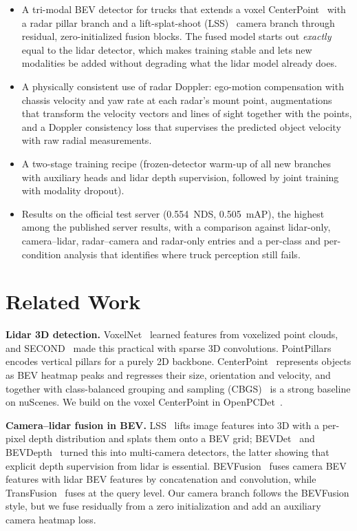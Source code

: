 \documentclass[conference]{IEEEtran}
\begin{document}
\begin{itemize}
\item A tri-modal BEV detector for trucks that extends a voxel CenterPoint~\cite{yin2021centerpoint} with a radar
pillar branch and a lift-splat-shoot (LSS)~\cite{philion2020lss} camera branch through residual, zero-initialized
fusion blocks. The fused model starts out \emph{exactly} equal to the lidar detector, which makes training stable and
lets new modalities be added without degrading what the lidar model already does.
\item A physically consistent use of radar Doppler: ego-motion compensation with chassis velocity and yaw rate at
each radar's mount point, augmentations that transform the velocity vectors and lines of sight together with the
points, and a Doppler consistency loss that supervises the predicted object velocity with raw radial measurements.
\item A two-stage training recipe (frozen-detector warm-up of all new branches with auxiliary heads and lidar depth
supervision, followed by joint training with modality dropout).
\item Results on the official test server (0.554~NDS, 0.505~mAP), the highest among the published server results, with
a comparison against lidar-only, camera--lidar, radar--camera and radar-only entries and a per-class and per-condition
analysis that identifies where truck perception still fails.
\end{itemize}

\section{Related Work}

\textbf{Lidar 3D detection.} VoxelNet~\cite{zhou2018voxelnet} learned features from voxelized point clouds, and
SECOND~\cite{yan2018second} made this practical with sparse 3D convolutions. PointPillars~\cite{lang2019pointpillars}
encodes vertical pillars for a purely 2D backbone. CenterPoint~\cite{yin2021centerpoint} represents objects as BEV
heatmap peaks and regresses their size, orientation and velocity, and together with class-balanced grouping and
sampling (CBGS)~\cite{zhu2019cbgs} is a strong baseline on nuScenes. We build on the voxel CenterPoint in
OpenPCDet~\cite{openpcdet2020}.

\textbf{Camera--lidar fusion in BEV.} LSS~\cite{philion2020lss} lifts image features into 3D with a per-pixel depth
distribution and splats them onto a BEV grid; BEVDet~\cite{huang2021bevdet} and BEVDepth~\cite{li2023bevdepth} turned
this into multi-camera detectors, the latter showing that explicit depth supervision from lidar is essential.
BEVFusion~\cite{liu2023bevfusion,liang2022bevfusion} fuses camera BEV features with lidar BEV features by
concatenation and convolution, while TransFusion~\cite{bai2022transfusion} fuses at the query level. Our camera
branch follows the BEVFusion style, but we fuse residually from a zero initialization and add an auxiliary camera
heatmap loss.
\end{document}
